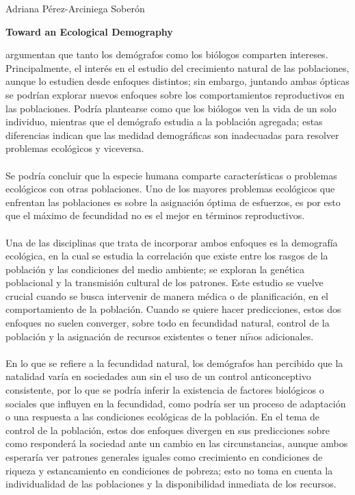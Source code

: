\documentclass[11pt,spanish,letterpaper]{article}
\theoremstyle{plain}
\begin{document}
\begin{flushleft}
Adriana P\'erez-Arciniega Sober\'on
\end{flushleft}
\begin{center}
\textbf{Toward an Ecological Demography}
\end{center}
\cite{low1992toward} argumentan que tanto los dem\'ografos como los bi\'ologos comparten intereses. Principalmente, el inter\'es en el estudio del crecimiento natural de las poblaciones, aunque lo estudien desde enfoques distintos; sin embargo, juntando ambas \'opticas se podr\'ian explorar nuevos enfoques sobre los comportamientos reproductivos en las poblaciones. Podr\'ia plantearse como que los bi\'ologos ven la vida de un solo individuo, mientras que el dem\'ografo estudia a la poblaci\'on agregada; estas diferencias indican que las medidad demogr\'aficas son inadecuadas para resolver problemas ecol\'ogicos y viceversa.\\
\\
Se podr\'ia concluir que la especie humana comparte caracter\'isticas o problemas ecol\'ogicos con otras poblaciones. Uno de los mayores problemas ecol\'ogicos que enfrentan las poblaciones es sobre la asignaci\'on \'optima de esfuerzos, es por esto que el m\'aximo de fecundidad no es el mejor en t\'erminos reproductivos.\\
\\
Una de las disciplinas que trata de incorporar ambos enfoques es la demograf\'ia ecol\'ogica, en la cual se estudia la correlaci\'on que existe entre los rasgos de la poblaci\'on y las condiciones del medio ambiente; se exploran la gen\'etica poblacional y la transmisi\'on cultural de los patrones. Este estudio se vuelve crucial cuando se busca intervenir de manera m\'edica o de planificaci\'on, en el comportamiento de la poblaci\'on. Cuando se quiere hacer predicciones, estos dos enfoques no suelen converger, sobre todo en fecundidad natural, control de la poblaci\'on y la asignaci\'on de recursos existentes o tener ni$\tilde{n}$os adicionales.\\
\\
En lo que se refiere a la fecundidad natural, los dem\'ografos han percibido que la natalidad var\'ia en sociedades aun sin el uso de un control anticonceptivo consistente, por lo que se podr\'ia inferir la existencia de factores biol\'ogicos o sociales que  influyen en la fecundidad, como podr\'ia ser un proceso de adaptaci\'on o una respuesta a las condiciones ecol\'ogicas de la poblaci\'on. En el tema de control de la poblaci\'on, estos dos enfoques divergen en sus predicciones sobre como responder\'a la sociedad ante un cambio en las circunstancias, aunque ambos esperar\'ia ver patrones generales iguales como crecimiento en condiciones de riqueza y estancamiento en condiciones de pobreza; esto no toma en cuenta la individualidad de las poblaciones y la disponibilidad inmediata de los recursos.\\
\end{document}
